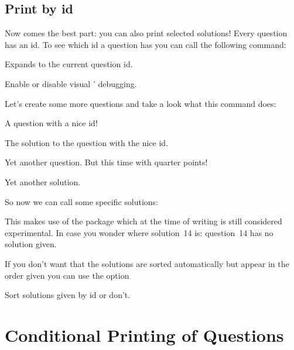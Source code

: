 \documentclass[load-preamble+]{cnltx-doc}
\begin{document}
\subsection{Print by \acs{id}}\label{ssec:ids}
Now comes the best part: you can also print selected solutions!  Every
question has an \acs{id}.  To see which \acs{id} a question has you can call
the following command:
\begin{commands}
  \expandable{}
    Expands to the current question \acs{id}.
\end{commands}
\begin{options}
    Enable or disable visual \ExSheets' debugging.
\end{options}
Let's create some more questions and take a look what this command does:
\begin{example}
  \begin{question}[ID=nice!]
    A question with a nice \acs{id}!
  \end{question}
  \begin{solution}
    The solution to the question with the nice \acs{id}.
  \end{solution}
  \begin{question}{3.75}
    Yet another question. But this time with quarter points!
  \end{question}
  \begin{solution}
    Yet another solution.
  \end{solution}
\end{example}

So now we can call some specific solutions:
\begin{example}
  \printsolutions[byID={first,nice!,10,14}]
\end{example}
This makes use of the  package which at the time of writing is
still considered experimental.  In case you wonder where solution~14 is:
question~14 has no solution given.

If you don't want that the solutions are sorted automatically but appear in
the order given you can use the option
\begin{options}
    Sort solutions given by \acs{id} or don't.
\end{options}

\section{Conditional Printing of Questions}\label{sec:cond-print-quest}
\end{document}
